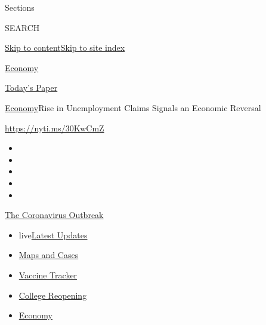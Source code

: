 Sections

SEARCH

\protect\hyperlink{site-content}{Skip to
content}\protect\hyperlink{site-index}{Skip to site index}

\href{https://www.nytimes.com/section/business/economy}{Economy}

\href{https://myaccount.nytimes.com/auth/login?response_type=cookie\&client_id=vi}{}

\href{https://www.nytimes.com/section/todayspaper}{Today's Paper}

\href{/section/business/economy}{Economy}\textbar{}Rise in Unemployment
Claims Signals an Economic Reversal

\url{https://nyti.ms/30KwCmZ}

\begin{itemize}
\item
\item
\item
\item
\item
\end{itemize}

\href{https://www.nytimes.com/news-event/coronavirus?action=click\&pgtype=Article\&state=default\&region=TOP_BANNER\&context=storylines_menu}{The
Coronavirus Outbreak}

\begin{itemize}
\tightlist
\item
  live\href{https://www.nytimes.com/2020/08/04/world/coronavirus-covid-19.html?action=click\&pgtype=Article\&state=default\&region=TOP_BANNER\&context=storylines_menu}{Latest
  Updates}
\item
  \href{https://www.nytimes.com/interactive/2020/us/coronavirus-us-cases.html?action=click\&pgtype=Article\&state=default\&region=TOP_BANNER\&context=storylines_menu}{Maps
  and Cases}
\item
  \href{https://www.nytimes.com/interactive/2020/science/coronavirus-vaccine-tracker.html?action=click\&pgtype=Article\&state=default\&region=TOP_BANNER\&context=storylines_menu}{Vaccine
  Tracker}
\item
  \href{https://www.nytimes.com/2020/08/02/us/covid-college-reopening.html?action=click\&pgtype=Article\&state=default\&region=TOP_BANNER\&context=storylines_menu}{College
  Reopening}
\item
  \href{https://www.nytimes.com/live/2020/08/03/business/stock-market-today-coronavirus?action=click\&pgtype=Article\&state=default\&region=TOP_BANNER\&context=storylines_menu}{Economy}
\end{itemize}

